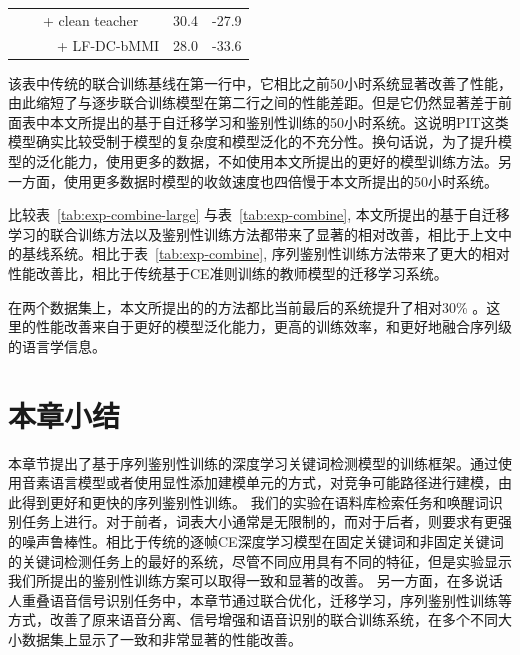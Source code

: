 \begin{table}[thbp!]
{\begin{tabular}{ c m{}||c c}
        &\ \ + clean teacher& 30.4& -27.9 \\
        &\ \ \ \ + LF-DC-bMMI& 28.0 & -33.6 \\ 
      \hline
    \end{tabular}
  }
\end{table}

该表中传统的联合训练基线在第一行中，它相比之前50小时系统显著改善了性能，由此缩短了与逐步联合训练模型在第二行之间的性能差距。但是它仍然显著差于前面表中本文所提出的基于自迁移学习和鉴别性训练的50小时系统。这说明PIT这类模型确实比较受制于模型的复杂度和模型泛化的不充分性。换句话说，为了提升模型的泛化能力，使用更多的数据，不如使用本文所提出的更好的模型训练方法。另一方面，使用更多数据时模型的收敛速度也四倍慢于本文所提出的50小时系统。

比较表~\ref{tab:exp-combine-large} 与表~\ref{tab:exp-combine},  本文所提出的基于自迁移学习的联合训练方法以及鉴别性训练方法都带来了显著的相对改善，相比于上文中的基线系统。相比于表~\ref{tab:exp-combine}, 序列鉴别性训练方法带来了更大的相对性能改善比，相比于传统基于CE准则训练的教师模型的迁移学习系统。

在两个数据集上，本文所提出的的方法都比当前最后的系统提升了相对30\% 。这里的性能改善来自于更好的模型泛化能力，更高的训练效率，和更好地融合序列级的语言学信息。


\section{本章小结}
\label{chap:kws-sum}

本章节提出了基于序列鉴别性训练的深度学习关键词检测模型的训练框架。通过使用音素语言模型或者使用显性添加建模单元的方式，对竞争可能路径进行建模，由此得到更好和更快的序列鉴别性训练。
我们的实验在语料库检索任务和唤醒词识别任务上进行。对于前者，词表大小通常是无限制的，而对于后者，则要求有更强的噪声鲁棒性。相比于传统的逐帧CE深度学习模型在固定关键词和非固定关键词的关键词检测任务上的最好的系统，尽管不同应用具有不同的特征，但是实验显示我们所提出的鉴别性训练方案可以取得一致和显著的改善。
%
另一方面，在多说话人重叠语音信号识别任务中，本章节通过联合优化，迁移学习，序列鉴别性训练等方式，改善了原来语音分离、信号增强和语音识别的联合训练系统，在多个不同大小数据集上显示了一致和非常显著的性能改善。
